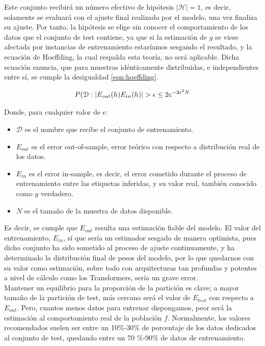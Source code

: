 Este conjunto recibirá un número efectivo de hipótesis $|\mathcal H|= 1$, es decir, solamente se evaluará con el ajuste final realizado por el modelo, una vez finaliza su ajuste. Por tanto, la hipótesis se elige sin conocer el comportamiento de los datos que el conjunto de test contiene, ya que si la estimación de $g$ se viese afectada por instancias de entrenamiento estaríamos sesgando el resultado, y la ecuación de Hoeffding, la cual respalda esta teoría, no será aplicable. Dicha ecuación enuncia, que para muestras idénticamente distribuidas, e independientes entre sí, se cumple la desigualdad \ref{eqn:hoeffding}.

\begin{equation}
	\label{eqn:hoeffding}
	\centering 
	P(\mathcal{D}: | E_{out}(h) E_{in}(h) |  > \epsilon \leq 2e^{-2\epsilon^2	N}
\end{equation}


Donde, para cualquier valor de $\epsilon$:
\begin{itemize}
	\item $\mathcal{D}$ es el nombre que recibe el conjunto de entrenamiento.
	\item $ E_{out}$ es el error out-of-sample, error teórico con respecto a distribución real de los datos.
	\item  $E_{in}$ es el error in-sample, es decir, el error cometido durante el proceso de entrenamiento entre las etiquetas inferidas, y su valor real, también conocido como $y$ verdadero.
	\item $N$ es el tamaño de la muestra de datos disponible.
\end{itemize}

Es decir, se cumple que $E_{out}$ resulta una estimación fiable del modelo. El valor del entrenamiento, $E_{in}$, sí que sería un estimador sesgado de manera optimista, pues dicho conjunto ha sido sometido al proceso de ajuste continuamente, y ha determinado la distribución final de pesos del modelo, por lo que quedarnos con su valor como estimación, sobre todo con arquitecturas tan profundas y potentes a nivel de cálculo como los Transformers, sería un grave error.\\

Mantener un equilibrio para la proporción de la partición es clave; a mayor tamaño de la partición de test, más cercano será el valor de $E_{test}$ con respecto a $E_{out}$. Pero, cuantos menos datos para entrenar dispongamos, peor será la estimación al comportamiento real de la población $f$. Normalmente, los valores recomendados suelen ser entre un 10\%-30\% de porcentaje de los datos dedicados al conjunto de test, quedando entre un 70 \%-90\% de datos de entrenamiento.\\

